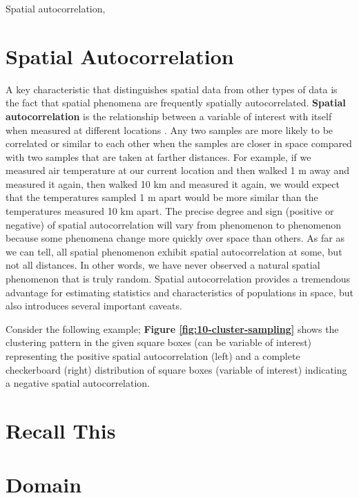 \documentclass[
]{book}
\begin{document}
Spatial autocorrelation,

\hypertarget{spatial-autocorrelation}{%
\section{Spatial Autocorrelation}\label{spatial-autocorrelation}}

A key characteristic that distinguishes spatial data from other types of data is the fact that spatial phenomena are frequently spatially autocorrelated. \textbf{Spatial autocorrelation} is the relationship between a variable of interest with itself when measured at different locations \citep{cliff_ad_and_ord_spatial_1973}. Any two samples are more likely to be correlated or similar to each other when the samples are closer in space compared with two samples that are taken at farther distances. For example, if we measured air temperature at our current location and then walked 1 m away and measured it again, then walked 10 km and measured it again, we would expect that the temperatures sampled 1 m apart would be more similar than the temperatures measured 10 km apart. The precise degree and sign (positive or negative) of spatial autocorrelation will vary from phenomenon to phenomenon because some phenomena change more quickly over space than others. As far as we can tell, all spatial phenomenon exhibit spatial autocorrelation at some, but not all distances. In other words, we have never observed a natural spatial phenomenon that is truly random. Spatial autocorrelation provides a tremendous advantage for estimating statistics and characteristics of populations in space, but also introduces several important caveats.

Consider the following example; \textbf{Figure \ref{fig:10-cluster-sampling}} shows the clustering pattern in the given square boxes (can be variable of interest) representing the positive spatial autocorrelation (left) and a complete checkerboard (right) distribution of square boxes (variable of interest) indicating a negative spatial autocorrelation.

\hypertarget{recall-this}{%
\section*{Recall This}\label{recall-this}}

\hypertarget{domain}{%
\section{Domain}\label{domain}}
\end{document}
